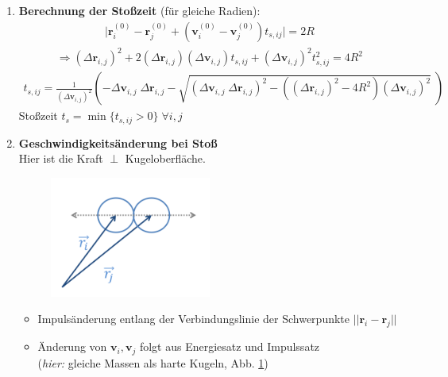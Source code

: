 \documentclass[12pt]{article}
\begin{document}
\begin{enumerate}
\item \textbf{Berechnung der Stoßzeit} (für gleiche Radien): 
\begin{align*}
\vert \mathbf{r}_i^{(0)} - \mathbf{r}_j^{(0)} + \left( \mathbf{v}_i^{(0)} - \mathbf{v}_j^{(0)} \right) t_{s,ij}  \vert = 2 R 
\end{align*}
\begin{align*}
\Rightarrow (\Delta \mathbf{r}_{i,j})^2 + 2(\Delta \mathbf{r}_{i,j})( \Delta\mathbf{v}_{i,j}) t_{s,ij} + (\Delta \mathbf{v}_{i,j})^2 t_{s,ij}^2 = 4R^2 
\end{align*}
\begin{align*}
t_{s,ij} =
 \frac{1}{(\Delta \mathbf{v}_{i,j})^2} 
 \left( 
 - \Delta \mathbf{v}_{i,j} \; \Delta \mathbf{r}_{i,j} - \sqrt{( \Delta \mathbf{v}_{i,j} \; \Delta \mathbf{r}_{i,j})^2 - \left( (\Delta \mathbf{r}_{i,j})^2 - 4R^2\right) (\Delta \mathbf{v}_{i,j})^2} \; \right)
\end{align*}
Stoßzeit $t_s = \min \{ t_{s,ij} > 0\} \; \forall i,j$
\item \textbf{Geschwindigkeitsänderung bei Stoß} \\
Hier ist die Kraft $\perp$ Kugeloberfläche.

\begin{figure}[ht]
\centering
\includegraphics[width=0.5\textwidth]{Folie72.png}
	\caption{}
	\label{fig:Geschwindigkeitsaenderung}
\end{figure}

\begin{itemize}
\item Impulsänderung  entlang der Verbindungslinie der Schwerpunkte $|| \mathbf{r}_{i} - \mathbf{r}_{j} ||$
\item Änderung von $\mathbf{v}_{i}, \mathbf{v}_{j}$ folgt aus Energiesatz und Impulssatz \\
(\textit{hier:} gleiche Massen als harte Kugeln, Abb. \ref{fig:Geschwindigkeitsaenderung})\\ 


\end{itemize}
\end{enumerate}
\end{document}
